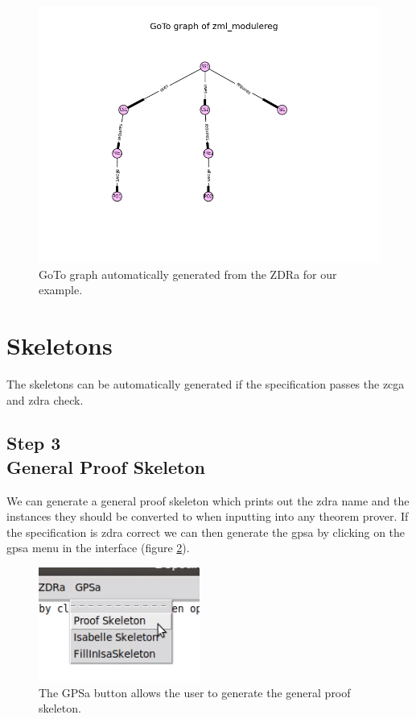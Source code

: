 \begin{figure}[H]
\centering
\includegraphics[scale=0.7]{Figures/fullexample/goto_fullexample.jpg}
\caption{GoTo graph automatically generated from the ZDRa for our example. \label{fig:gotoexample}}
\end{figure}

\section{Skeletons}

The skeletons can be automatically generated if the specification passes the
\gls{zcga} and \gls{zdra} check.

\subsection{Step 3\\General Proof Skeleton}

We can generate a general proof skeleton which prints out the \gls{zdra} name
and the instances they should be converted to when inputting into any theorem
prover. If the specification is \gls{zdra} correct we can then generate the
\gls{gpsa} by clicking on the \gls{gpsa} menu in the interface (figure
\ref{fig:gpsabutton}).

\begin{figure}[H]
\centering
\includegraphics[scale=1]{Figures/fullexample/proofskelbutton.png}
\caption{The GPSa button allows the user to generate the general proof skeleton. \label{fig:gpsabutton}}
\end{figure}

